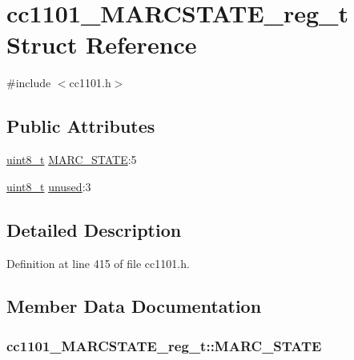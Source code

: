 \hypertarget{structcc1101___m_a_r_c_s_t_a_t_e__reg__t}{}\section{cc1101\+\_\+\+M\+A\+R\+C\+S\+T\+A\+T\+E\+\_\+reg\+\_\+t Struct Reference}
\label{structcc1101___m_a_r_c_s_t_a_t_e__reg__t}


{\ttfamily \#include $<$cc1101.\+h$>$}

\subsection*{Public Attributes}
\begin{DoxyCompactItemize}
\item 
\hyperlink{_p_e___types_8h_aba7bc1797add20fe3efdf37ced1182c5}{uint8\+\_\+t} \hyperlink{structcc1101___m_a_r_c_s_t_a_t_e__reg__t_aa7c6be19fa03b5dbfa2081b15601023b}{M\+A\+R\+C\+\_\+\+S\+T\+A\+TE}\+:5
\item 
\hyperlink{_p_e___types_8h_aba7bc1797add20fe3efdf37ced1182c5}{uint8\+\_\+t} \hyperlink{structcc1101___m_a_r_c_s_t_a_t_e__reg__t_a992799c1387939b207b0a360acad2812}{unused}\+:3
\end{DoxyCompactItemize}


\subsection{Detailed Description}


Definition at line 415 of file cc1101.\+h.



\subsection{Member Data Documentation}
\subsubsection[{\texorpdfstring{M\+A\+R\+C\+\_\+\+S\+T\+A\+TE}{MARC_STATE}}]{ cc1101\+\_\+\+M\+A\+R\+C\+S\+T\+A\+T\+E\+\_\+reg\+\_\+t\+::\+M\+A\+R\+C\+\_\+\+S\+T\+A\+TE}\hypertarget{structcc1101___m_a_r_c_s_t_a_t_e__reg__t_aa7c6be19fa03b5dbfa2081b15601023b}{}\label{structcc1101___m_a_r_c_s_t_a_t_e__reg__t_aa7c6be19fa03b5dbfa2081b15601023b}



